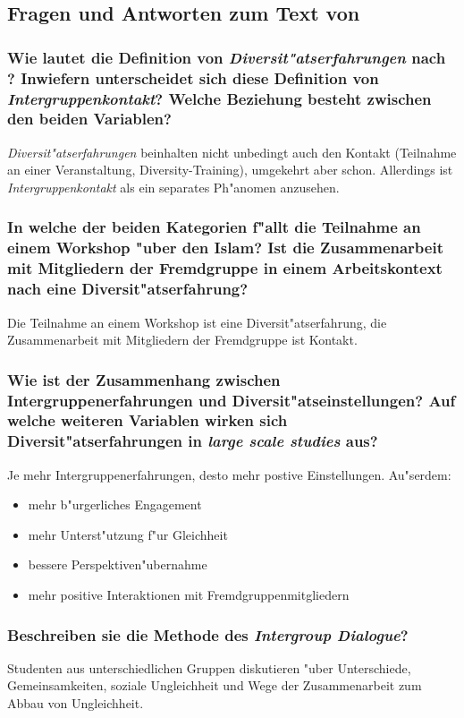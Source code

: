 \subsection{Fragen und Antworten zum Text von \textcite{aberson_diversity_2010}}
\subsubsection{Wie lautet die Definition von \emph{Diversit"atserfahrungen} nach \textcite{aberson_diversity_2010}? Inwiefern unterscheidet sich diese Definition von \emph{Intergruppenkontakt}? Welche Beziehung besteht zwischen den beiden Variablen?}
\emph{Diversit"atserfahrungen} beinhalten nicht unbedingt auch den Kontakt (Teilnahme an einer Veranstaltung, Diversity-Training), umgekehrt aber schon. Allerdings ist \emph{Intergruppenkontakt} als ein separates Ph"anomen anzusehen.

\subsubsection{In welche der beiden Kategorien f"allt die Teilnahme an einem Workshop "uber den Islam? Ist die Zusammenarbeit mit Mitgliedern der Fremdgruppe in einem Arbeitskontext nach \textcite{aberson_diversity_2010} eine Diversit"atserfahrung?}
Die Teilnahme an einem Workshop ist eine Diversit"atserfahrung, die Zusammenarbeit mit Mitgliedern der Fremdgruppe ist Kontakt.

\subsubsection{Wie ist der Zusammenhang zwischen Intergruppenerfahrungen und Diversit"atseinstellungen? Auf welche weiteren Variablen wirken sich Diversit"atserfahrungen in \emph{large scale studies} aus?}
Je mehr Intergruppenerfahrungen, desto mehr postive Einstellungen. Au"serdem:
\begin{itemize}
        \item mehr b"urgerliches Engagement
        \item mehr Unterst"utzung f"ur Gleichheit
        \item bessere Perspektiven"ubernahme
        \item mehr positive Interaktionen mit Fremdgruppenmitgliedern
\end{itemize}

\subsubsection{Beschreiben sie die Methode des \emph{Intergroup Dialogue}?}
Studenten aus unterschiedlichen Gruppen diskutieren "uber Unterschiede, Gemeinsamkeiten, soziale Ungleichheit und Wege der Zusammenarbeit zum Abbau von Ungleichheit.

